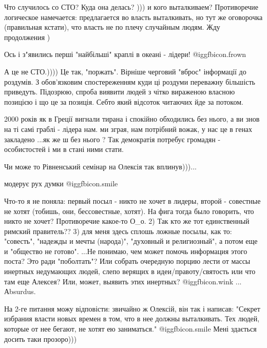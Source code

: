 \begin{itemize}

Что случилось со СТО? Куда она делась? ))) и кого выталкиваем? Противоречие
логическое намечается: предлагается во власть выталкивать, но тут же оговорочка
(правильная кстати), что власть не по плечу случайным людям. Жду продолжения )


Ось і з"явились перші "найбільші" краплі в океані - лідери!  @igg{fbicon.frown} 


А це не СТО.)))) Це так, "поржать". Вірніше черговий "вброс" інформації до
роздумів. З обов'язковим спостереженням куди ці роздуми переважну більшість
приведуть. Підозрюю, спроба виявити людей з чітко вираженою власною позицією і
що це за позиція. Себто який відсоток читаючих йде за потоком.



2000 років як в Греції вигнали тирана і спокійно обходились без нього, а ви
знов на ті самі граблі - лідера нам. ми зграя, нам потрібний вожак, у нас це
в генах закладено ...як же ш без нього ? Так демократія потребує громадян -
особистостей і ми в стані ними стати.

Чи може то Рівненський семінар на Олексія так вплинув)))...

модерує рух думки  @igg{fbicon.smile} 


Что-то я не поняла: первый посыл - никто не хочет в лидеры, второй - совестные
не хотят (тобишь, они, бессовестные, хотят). На фига тогда было говорить, что
никто не хочет? Противоречие какое-то О\_о. 2) Так кто же тот единственный
римский правитель?? 3) для меня здесь сплошь ложные посылы, как то: "совесть",
"надежды и мечты (народа)", "духовный и религиозный", а потом еще и "общество
не готово". ...Не понимаю, чем может помочь информация этого поста? Это ради
"поболтать"? Или собрать очередную порцию лести от массы инертных недумающих
людей, слепо верящих в идеи/правоту/святость или что там еще Алексея? Или,
может, выявить этих инертных?  @igg{fbicon.wink}  ... Аbsurdus.


На 2-ге питання можу відповісти: звичайно ж Олексій, він так і написав: "Секрет
избрания власти новых времен в том, что в нее должны выталкивать. Тех людей,
которые от нее бегают, не хотят ею заниматься."  @igg{fbicon.smile}  Мені здається досить таки
прозоро)))


\end{itemize}
